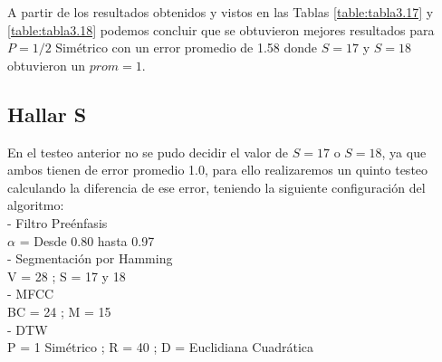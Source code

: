 \vskip 1cm
A partir de los resultados obtenidos y vistos en las Tablas \ref{table:tabla3.17} y \ref{table:tabla3.18} podemos concluir que se obtuvieron mejores resultados para $P = 1/2$ Simétrico con un error promedio de 1.58 donde $S = 17$ y $S = 18$ obtuvieron un $prom = 1$.

\subsection{Hallar S}
En el testeo anterior no se pudo decidir el valor de $S = 17$ o $S = 18$, ya que ambos tienen de error promedio 1.0, para ello realizaremos un quinto testeo calculando la diferencia de ese error, teniendo la siguiente configuración del algoritmo: \\
- Filtro Preénfasis \\
\hspace*{1cm} $\alpha$ = Desde 0.80 hasta 0.97 \\
- Segmentación por Hamming \\
\hspace*{1cm} V = 28 ; \qquad S = 17 y 18 \\
- MFCC \\
\hspace*{1cm} BC = 24 ; \qquad M = 15 \\
- DTW \\
\hspace*{1cm} P = 1 Simétrico ; \qquad R = 40 ; \qquad D = Euclidiana Cuadrática

